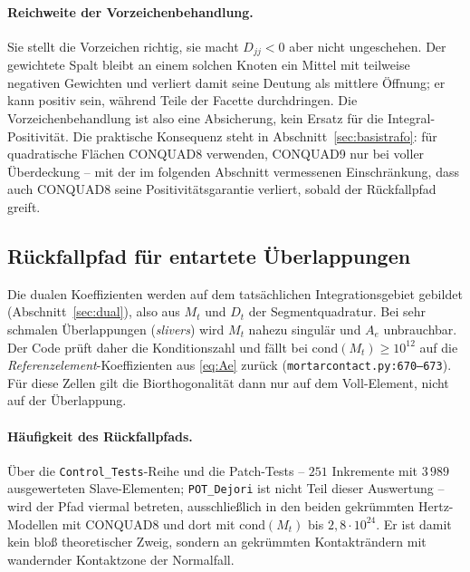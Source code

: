\documentclass[a4paper,11pt]{article}
\def\bm#1{#1}%
\def\tilde#1{#1}%
\newcommand{\file}[1]{\texttt{\small #1}}
\begin{document}
\paragraph{Reichweite der Vorzeichenbehandlung.}
Sie stellt die Vorzeichen richtig, sie macht $\tilde D_{jj}<0$ aber nicht ungeschehen. Der
gewichtete Spalt bleibt an einem solchen Knoten ein Mittel mit teilweise negativen Gewichten und
verliert damit seine Deutung als mittlere Öffnung; er kann positiv sein, während Teile der Facette
durchdringen. Die Vorzeichenbehandlung ist also eine Absicherung, kein Ersatz für die
Integral-Positivität. Die praktische Konsequenz steht in Abschnitt~\ref{sec:basistrafo}: für
quadratische Flächen CONQUAD8 verwenden, CONQUAD9 nur bei voller Überdeckung -- mit der im
folgenden Abschnitt vermessenen Einschränkung, dass auch CONQUAD8 seine Positivitätsgarantie
verliert, sobald der Rückfallpfad greift.

\subsection{Rückfallpfad für entartete Überlappungen}
\label{sec:sliver}
Die dualen Koeffizienten werden auf dem tatsächlichen Integrationsgebiet gebildet
(Abschnitt~\ref{sec:dual}), also aus $\bm M_t$ und $\bm D_t$ der Segmentquadratur. Bei sehr
schmalen Überlappungen (\emph{slivers}) wird $\bm M_t$ nahezu singulär und $\bm A_e$ unbrauchbar.
Der Code prüft daher die Konditionszahl und fällt bei $\mathrm{cond}(\bm M_t)\ge10^{12}$ auf die
\emph{Referenzelement}-Koeffizienten aus \eqref{eq:Ae} zurück
(\file{mortarcontact.py:\allowbreak{}670--673}). Für diese Zellen gilt die Biorthogonalität dann
nur auf dem Voll-Element, nicht auf der Überlappung.

\paragraph{Häufigkeit des Rückfallpfads.}
Über die \file{Control\_Tests}-Reihe und die Patch-Tests -- $251$ Inkremente mit $3\,989$
ausgewerteten Slave-Elementen; \file{POT\_Dejori} ist nicht Teil dieser Auswertung -- wird der Pfad
viermal betreten, ausschließlich in den beiden gekrümmten Hertz-Modellen mit CONQUAD8 und dort mit
$\mathrm{cond}(\bm M_t)$ bis $2{,}8\cdot10^{24}$. Er ist damit kein bloß theoretischer Zweig,
sondern an gekrümmten Kontakträndern mit wandernder Kontaktzone der Normalfall.
\end{document}
